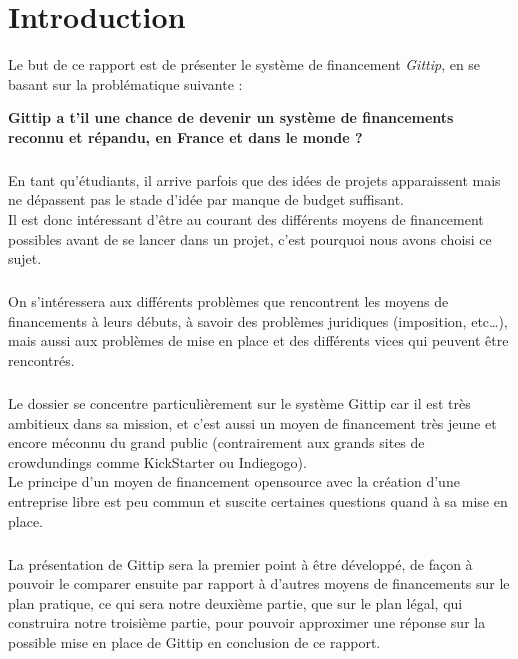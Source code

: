 \chapter{Introduction}

Le but de ce rapport est de présenter le système de financement \emph{Gittip},
en se basant sur la problématique suivante :

\begin{center}
\textbf{Gittip a t'il une chance de devenir un système de
financements reconnu et répandu, en France et dans le monde ?}
\end{center}

\paragraph{}
En tant qu'étudiants, il arrive parfois que des idées de projets apparaissent
mais ne dépassent pas le stade d'idée par manque de budget suffisant.\\
Il est donc intéressant d'être au courant des différents moyens de financement
possibles avant de se lancer dans un projet, c'est pourquoi nous avons
choisi ce sujet.

\paragraph{}
On s'intéressera aux différents problèmes que rencontrent les moyens
de financements à leurs débuts, à savoir des problèmes juridiques
(imposition, etc\ldots), mais aussi aux problèmes de mise en place et des
différents vices qui peuvent être rencontrés.

\paragraph{}
Le dossier se concentre particulièrement sur le système Gittip car il
est très ambitieux dans sa mission, et c'est aussi un moyen de financement
très jeune et encore méconnu du grand public (contrairement aux grands sites
de crowdundings comme KickStarter ou Indiegogo).\\
Le principe d'un moyen de financement opensource avec la création d'une
entreprise libre est peu commun et suscite certaines questions quand à sa
mise en place.

\paragraph{}
La présentation de Gittip sera la premier point à être développé, de
façon à pouvoir le comparer ensuite par rapport à d'autres moyens de
financements sur le plan pratique, ce qui sera notre deuxième partie,
que sur le plan légal, qui construira notre troisième partie, pour pouvoir
approximer une réponse sur la possible mise en place de Gittip en conclusion
de ce rapport.
